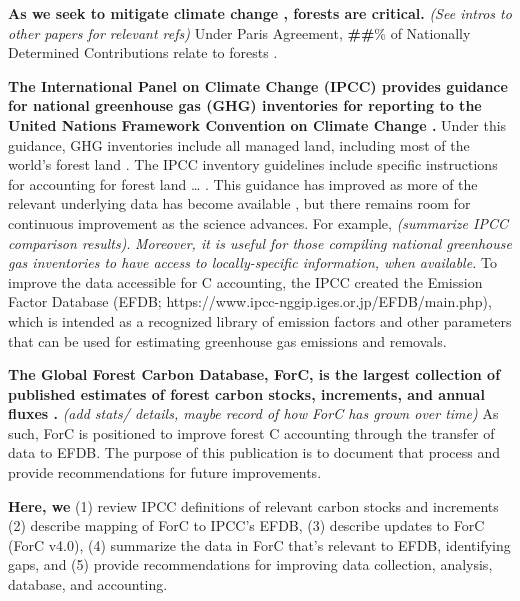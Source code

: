\documentclass[, manuscript]{copernicus}
\begin{document}
\introduction[Introduction]

\textbf{As we seek to mitigate climate change
\citep{unfccc_adoption_2015}, forests are critical.} \emph{(See intros
to other papers for relevant refs)} Under Paris Agreement,
\textbf{\#\#}\% of Nationally Determined Contributions relate to forests
\citep{grassi_key_2017}.

\textbf{The International Panel on Climate Change (IPCC) provides
guidance for national greenhouse gas (GHG) inventories for reporting to
the United Nations Framework Convention on Climate Change \citep[UNFCCC,
(REFS for older guidelines),][]{ipcc_2019_2019}.} Under this guidance,
GHG inventories include all managed land, including most of the world's
forest land \citep{ogle_delineating_2018}. The IPCC inventory guidelines
include specific instructions for accounting for forest land \ldots{}
\citep{ipcc_agriculture_2006, ipcc_2019_2019a}. This guidance has
improved as more of the relevant underlying data has become available
\citep{requenasuarez_estimating_2019}, but there remains room for
continuous improvement as the science advances. For example,
\citet{cook-patton_mapping_2020} \emph{(summarize IPCC comparison
results)}. \emph{Moreover, it is useful for those compiling national
greenhouse gas inventories to have access to locally-specific
information, when available.} To improve the data accessible for C
accounting, the IPCC created the Emission Factor Database (EFDB;
https://www.ipcc-nggip.iges.or.jp/EFDB/main.php), which is intended as a
recognized library of emission factors and other parameters that can be
used for estimating greenhouse gas emissions and removals.

\textbf{The Global Forest Carbon Database, ForC, is the largest
collection of published estimates of forest carbon stocks, increments,
and annual fluxes
\citep{anderson-teixeira_forc_2018, anderson-teixeira_carbon_2021}.}
\emph{(add stats/ details, maybe record of how ForC has grown over
time)} As such, ForC is positioned to improve forest C accounting
through the transfer of data to EFDB. The purpose of this publication is
to document that process and provide recommendations for future
improvements.

\textbf{Here, we} (1) review IPCC definitions of relevant carbon stocks
and increments (2) describe mapping of ForC to IPCC's EFDB, (3) describe
updates to ForC (ForC v4.0), (4) summarize the data in ForC that's
relevant to EFDB, identifying gaps, and (5) provide recommendations for
improving data collection, analysis, database, and accounting.
\end{document}
